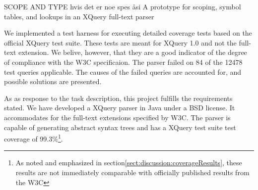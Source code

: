 SCOPE AND TYPE hvis det er noe spes \aa si \rightarrow A prototype for scoping, symbol tables, and lookups in an XQuery full-text parser

We implemented a test harness for executing detailed coverage tests based on the official XQuery test suite\cite{w3c05}. These tests are meant for XQuery 1.0 and not the full-text extension. We belive, however, that they are a good indicator of the degree of compliance with the W3C specificaion. The parser failed on 84 of the 12478 test queries applicable. The causes of the failed queries are accounted for, and possible solutions are presented.

As as response to the task description, this project fulfills the requirements stated. We have developed a XQuery parser in Java under a BSD license. It accommodates for the full-text extensions specified by W3C. The parser is capable of generating abstract syntax trees and has a XQuery test suite test coverage of 99.3\%\footnote{As noted and emphasized in section\ref{sect:discussion:coverageResults}, these results are not immediately comparable with officially published results from the W3C}.
